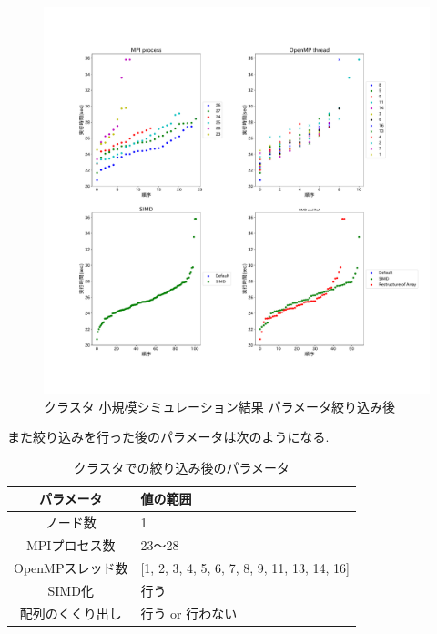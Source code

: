 \begin{figure}[htb]
\begin{center}
    \includegraphics[width=14cm]{./images/cluster-bench-adjusted-final.pdf}
    \caption{クラスタ 小規模シミュレーション結果 パラメータ絞り込み後}
    \label{fig:cluster-bench-adjusted-final}
\end{center}
\end{figure}
\clearpage
また絞り込みを行った後のパラメータは次のようになる.\\
\begin{table}[htb]
  \caption {クラスタでの絞り込み後のパラメータ}
  \begin{center}
    \begin{tabular}{|c|p{12cm}|}
      \hline
      パラメータ & 値の範囲\\ \hline
      ノード数 & 1\\ \hline
      MPIプロセス数 & 23〜28\\ \hline
      OpenMPスレッド数 & [1, 2, 3, 4, 5, 6, 7, 8, 9, 11, 13, 14, 16]\\ \hline
      SIMD化 & 行う\\ \hline
      配列のくくり出し & 行う or 行わない\\ \hline
    \end{tabular}
  \end{center}
\end{table}

